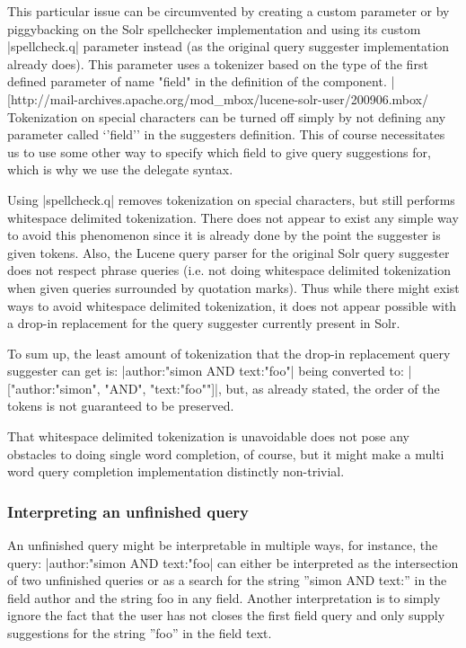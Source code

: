 This particular issue can be circumvented by creating a custom parameter or by piggybacking on the Solr spellchecker implementation and using its custom |spellcheck.q| parameter instead (as the original query suggester implementation already does).
This parameter uses a tokenizer based on the type of the first defined parameter of name "field" in the definition of the component. |[http://mail-archives.apache.org/mod_mbox/lucene-solr-user/200906.mbox/%
Tokenization on special characters can be turned off simply by not defining any parameter called ‘’field’’ in the suggesters definition. This of course necessitates us to use some other way to specify which field to give query suggestions for, which is why we use the delegate syntax.

Using |spellcheck.q| removes tokenization on special characters, but still performs whitespace delimited tokenization. There does not appear to exist any simple way to avoid this phenomenon since it is already done by the point the suggester is given tokens. Also, the Lucene query parser for the original Solr query suggester does not respect phrase queries (i.e. not doing whitespace delimited tokenization when given queries surrounded by quotation marks). Thus while there might exist ways to avoid whitespace delimited tokenization, it does not appear possible with a drop-in replacement for the query suggester currently present in Solr.

To sum up, the least amount of tokenization that the drop-in replacement query suggester can get is: |author:"simon AND text:"foo"| being converted to: |["author:"simon", "AND", "text:"foo""]|, but, as already stated, the order of the tokens is not guaranteed to be preserved.

That whitespace delimited tokenization is unavoidable does not pose any obstacles to doing single word completion, of course, but it might make a multi word query completion implementation distinctly non-trivial. 

\subsubsection{Interpreting an unfinished query}

An unfinished query might be interpretable in multiple ways, for instance, the query: |author:"simon AND text:"foo| can either be interpreted as the intersection of two unfinished queries or as a search for the string ''simon AND text:'' in the field author and the string foo in any field. Another interpretation is to simply ignore the fact that the user has not closes the first field query and only supply suggestions for the string ''foo'' in the field text. 

